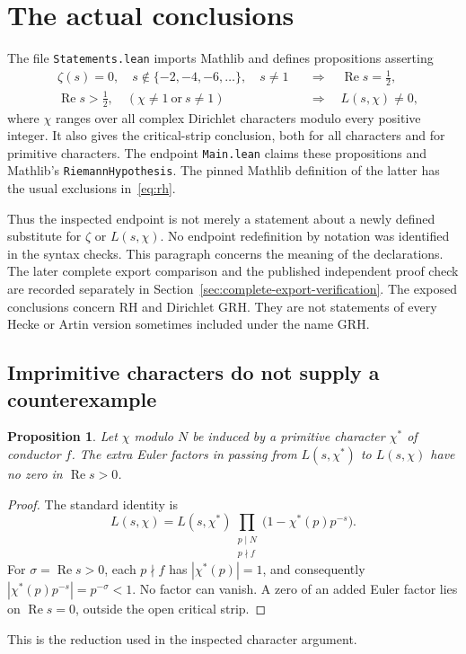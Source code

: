 \documentclass[11pt,a4paper]{article}
\newtheorem{proposition}{Proposition}[section]
\theoremstyle{remark}
\DeclareMathOperator{\Rea}{Re}
\newcommand{\src}[1]{\cite{#1}}
\newcommand{\code}[1]{\texttt{#1}}
\begin{document}
\section{The actual conclusions}
The file \code{Statements.lean} imports Mathlib and defines propositions asserting
\begin{align}
&\zeta(s)=0,\quad s\notin\{-2,-4,-6,\ldots\},\quad s\ne1
       &&\Longrightarrow\quad \Rea s=\tfrac12, \label{eq:rh}\\
&\Rea s>\tfrac12,\quad (\chi\ne1\ \text{or}\ s\ne1)
       &&\Longrightarrow\quad L(s,\chi)\ne0, \label{eq:grh}
\end{align}
where $\chi$ ranges over all complex Dirichlet characters modulo every positive integer. It also gives the critical-strip conclusion, both for all characters and for primitive characters. The endpoint \code{Main.lean} claims these propositions and Mathlib's \code{RiemannHypothesis}. The pinned Mathlib definition of the latter has the usual exclusions in~\eqref{eq:rh}. \src{S-endpoint,mathlib}

Thus the inspected endpoint is not merely a statement about a newly defined substitute for $\zeta$ or $L(s,\chi)$. No endpoint redefinition by notation was identified in the syntax checks. This paragraph concerns the meaning of the declarations. The later complete export comparison and the published independent proof check are recorded separately in Section~\ref{sec:complete-export-verification}. The exposed conclusions concern RH and Dirichlet GRH. They are not statements of every Hecke or Artin version sometimes included under the name GRH.

\subsection{Imprimitive characters do not supply a counterexample}
\begin{proposition}
Let $\chi$ modulo $N$ be induced by a primitive character $\chi^{*}$ of conductor $f$. The extra Euler factors in passing from $L(s,\chi^{*})$ to $L(s,\chi)$ have no zero in $\Rea s>0$.
\end{proposition}
\begin{proof}
The standard identity is
\[
 L(s,\chi)=L(s,\chi^{*})
 \prod_{\substack{p\mid N\\p\nmid f}}
       \bigl(1-\chi^{*}(p)p^{-s}\bigr).
\]
For $\sigma=\Rea s>0$, each $p\nmid f$ has $|\chi^{*}(p)|=1$, and consequently
$|\chi^{*}(p)p^{-s}|=p^{-\sigma}<1$.
No factor can vanish. A zero of an added Euler factor lies on $\Rea s=0$, outside the open critical strip.
\end{proof}
This is the reduction used in the inspected character argument. \src{S-character}
\end{document}

